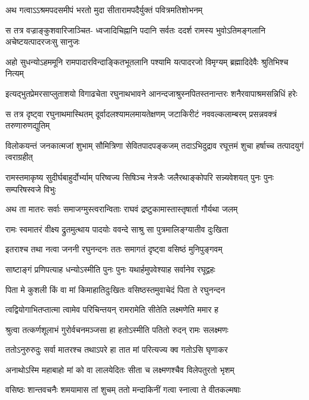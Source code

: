 \twolineshloka
{अथ गत्वाऽऽश्रमपदसमीपं भरतो मुदा}
{सीतारामपदैर्युक्तं पवित्रमतिशोभनम्} %

\fourlineindentedshloka
{स तत्र वज्राङ्कुशवारिजाञ्चित-}
{ध्वजादिचिह्नानि पदानि सर्वतः}
{ददर्श रामस्य भुवोऽतिमङ्गलानि}
{अचेष्टयत्पादरजःसु सानुजः} %

\fourlineindentedshloka
{अहो सुधन्योऽहममूनि}
{रामपादारविन्दाङ्कितभूतलानि}
{पश्यामि यत्पादरजो विमृग्यम्}
{ब्रह्मादिदेवैः श्रुतिभिश्च नित्यम्} %

\fourlineindentedshloka
{इत्यद्भुतप्रेमरसाप्लुताशयो}
{विगाढचेता रघुनाथभावने}
{आनन्दजाश्रुस्नपितस्तनान्तरः}
{शनैरवापाश्रमसन्निधिं हरेः} %

\fourlineindentedshloka
{स तत्र दृष्ट्वा रघुनाथमास्थितम्}
{दूर्वादलश्यामलमायतेक्षणम्}
{जटाकिरीटं नववल्कलाम्बरम्}
{प्रसन्नवक्त्रं तरुणारुणद्युतिम्} %

\fourlineindentedshloka
{विलोकयन्तं जनकात्मजां शुभाम्}
{सौमित्रिणा सेवितपादपङ्कजम्}
{तदाऽभिदुद्राव रघूत्तमं शुचा}
{हर्षाच्च तत्पादयुगं त्वराग्रहीत्} %

\fourlineindentedshloka
{रामस्तमाकृष्य सुदीर्घबाहुर्दोर्भ्याम्}
{परिष्वज्य सिषिञ्च नेत्रजैः}
{जलैरथाङ्कोपरि सन्न्यवेशयत्}
{पुनः पुनः सम्परिषस्वजे विभुः} %

\twolineshloka
{अथ ता मातरः सर्वाः समाजग्मुस्त्वरान्विताः}
{राघवं द्रष्टुकामास्तास्तृषार्ता गौर्यथा जलम्} %

\twolineshloka
{रामः स्वमातरं वीक्ष्य द्रुतमुत्थाय पादयोः}
{ववन्दे साश्रु सा पुत्रमालिङ्ग्यातीव दुःखिता} %

\twolineshloka
{इतराश्च तथा नत्वा जननी रघुनन्दनः}
{ततः समागतं दृष्ट्वा वसिष्ठं मुनिपुङ्गवम्} %

\twolineshloka
{साष्टाङ्गं प्रणिपत्याह धन्योऽस्मीति पुनः पुनः}
{यथार्हमुपवेश्याह सर्वानेव रघूद्वहः} %

\twolineshloka
{पिता मे कुशली किं वा मां किमाहातिदुःखितः}
{वसिष्ठस्तमुवाचेदं पिता ते रघुनन्दन} %

\twolineshloka
{त्वद्वियोगाभितप्तात्मा त्वामेव परिचिन्तयन्}
{रामरामेति सीतेति लक्ष्मणेति ममार ह} %

\twolineshloka
{श्रुत्वा तत्कर्णशूलाभं गुरोर्वचनमञ्जसा}
{हा हतोऽस्मीति पतितो रुदन् रामः सलक्ष्मणः} %

\twolineshloka
{ततोऽनुरुरुदुः सर्वा मातरश्च तथाऽपरे}
{हा तात मां परित्यज्य क्व गतोऽसि घृणाकर} %

\twolineshloka
{अनाथोऽस्मि महाबाहो मां को वा लालयेदितः}
{सीता च लक्ष्मणश्चैव विलेपतुरतो भृशम्} %

\twolineshloka
{वसिष्ठः शान्तवचनैः शमयामास तां शुचम्}
{ततो मन्दाकिनीं गत्वा स्नात्वा ते वीतकल्मषाः} %

